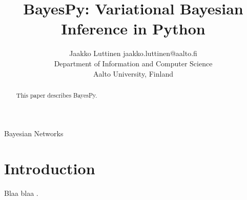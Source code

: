 \documentclass[twoside,11pt]{article}
\begin{document}
\title{BayesPy: Variational Bayesian Inference in Python}

\author{\name Jaakko Luttinen \email jaakko.luttinen@aalto.fi \\
       \addr Department of Information and Computer Science\\
       Aalto University, Finland}


\maketitle

\begin{abstract}%
  This paper describes BayesPy.
\end{abstract}

\begin{keywords}
  Bayesian Networks
\end{keywords}

\section{Introduction}

Blaa blaa \cite{Luttinen:2013}.




\vskip 0.2in

\end{document}
